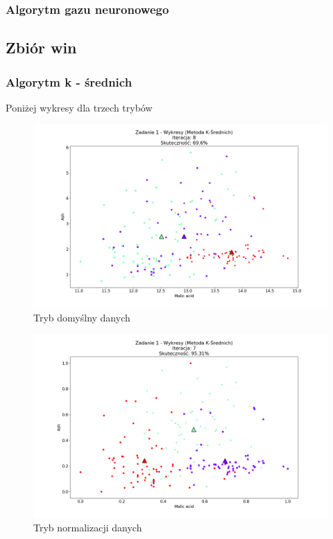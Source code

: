 \documentclass{classrep}
\begin{document}
{{		\subsubsection{Algorytm gazu neuronowego}
		{

		}
	}
	\subsection{Zbiór win}
	{
		\subsubsection{Algorytm k - średnich}
		{
			Poniżej wykresy dla trzech trybów
				\begin{figure}[!htbp]
					\centering
					\includegraphics[width=\textwidth,width=95mm]{wykresy/plot_k_meansWineDefault.png}
					\caption{Tryb domyślny danych}
				\end{figure}
			
				\begin{figure}[!htbp]
					\centering
					\includegraphics[width=\textwidth,width=95mm]{wykresy/plot_k_meansWineNormalised.png}
					\caption{Tryb normalizacji danych}
				\end{figure}
		
}}}
\end{document}
